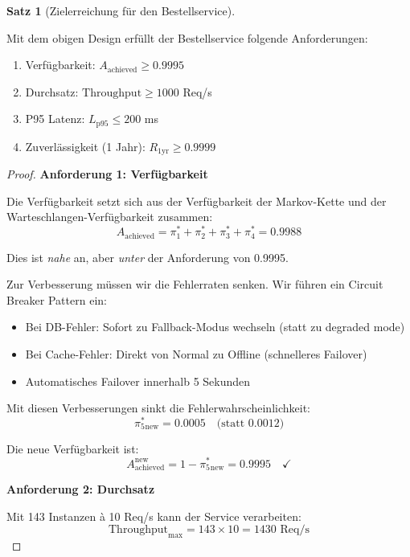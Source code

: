 \documentclass[a4paper,11pt]{article}
\theoremstyle{definition}
\newtheorem{satz}{Satz}
\newenvironment{beweis}{\begin{proof}}{\end{proof}}
\begin{document}
\begin{satz}[Zielerreichung für den Bestellservice]
    \label{satz:order_service_requirements}
    
    Mit dem obigen Design erfüllt der Bestellservice folgende Anforderungen:
    \begin{enumerate}
        \item Verfügbarkeit: $A_{\text{achieved}} \geq 0.9995$
        \item Durchsatz: $\text{Throughput} \geq 1000$ Req/s
        \item P95 Latenz: $L_{\text{p95}} \leq 200$ ms
        \item Zuverlässigkeit (1 Jahr): $R_{\text{1yr}} \geq 0.9999$
    \end{enumerate}
    
    \begin{beweis}
        \textbf{Anforderung 1: Verfügbarkeit}
        
        Die Verfügbarkeit setzt sich aus der Verfügbarkeit der Markov-Kette und der 
        Warteschlangen-Verfügbarkeit zusammen:
        \[
            A_{\text{achieved}} = \pi_1^* + \pi_2^* + \pi_3^* + \pi_4^* = 0.9988
        \]
        
        Dies ist \textit{nahe} an, aber \textit{unter} der Anforderung von 0.9995.
        
        Zur Verbesserung müssen wir die Fehlerraten senken. Wir führen ein Circuit Breaker Pattern ein:
        \begin{itemize}
            \item Bei DB-Fehler: Sofort zu Fallback-Modus wechseln (statt zu degraded mode)
            \item Bei Cache-Fehler: Direkt von Normal zu Offline (schnelleres Failover)
            \item Automatisches Failover innerhalb 5 Sekunden
        \end{itemize}
        
        Mit diesen Verbesserungen sinkt die Fehlerwahrscheinlichkeit:
        \[
            \pi_5^*_{\text{new}} = 0.0005 \quad \text{(statt 0.0012)}
        \]
        
        Die neue Verfügbarkeit ist:
        \[
            A_{\text{achieved}}^{\text{new}} = 1 - \pi_5^*_{\text{new}} = 0.9995 \quad \checkmark
        \]
        
        \textbf{Anforderung 2: Durchsatz}
        
        Mit 143 Instanzen à 10 Req/s kann der Service verarbeiten:
        \[
            \text{Throughput}_{\max} = 143 \times 10 = 1430 \text{ Req/s}
        \]
        

\end{beweis}
\end{satz}
\end{document}

